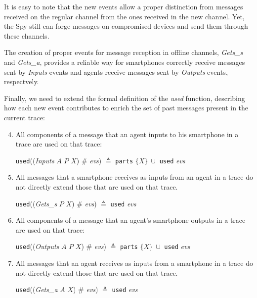 It is easy to note that the new events allow a proper distinction from messages received on the regular channel from the ones received in the new channel. Yet, the Spy still can forge messages on compromised devices and send them through these channels.

The creation of proper events for message reception in offline channels, \textit{Gets\_s} and \textit{Gets\_a}, provides a reliable way for smartphones correctly receive messages sent by \textit{Inputs} events and agents receive messages sent by \textit{Outputs} events, respectvely.

Finally, we need to extend the formal definition of the \textit{used} function, describing how each new event contributes to enrich the set of past messages present in the current trace:

\begin{enumerate}
  \setcounter{enumi}{3}
  \item All components of a message that an agent inputs to his smartphone in a trace are used on that trace:
  \begin{center}
    \texttt{used}((\textit{Inputs} $A$ $P$ $X$) $\#$ \textit{evs}) $\triangleq$ \texttt{parts} $\{ X\}\ \cup$ \texttt{used} \textit{evs}
  \end{center}

  \item All messages that a smartphone receives as inputs from an agent in a trace do not directly extend those that are used on that trace.
  \begin{center}
    \texttt{used}((\textit{Gets\_s} $P$ $X$) $\#$ \textit{evs}) $\triangleq$ \texttt{used} \textit{evs}
  \end{center}

  \item All components of a message that an agent's smartphone outputs in a trace are used on that trace:
  \begin{center}
    \texttt{used}((\textit{Outputs} $A$ $P$ $X$) $\#$ \textit{evs}) $\triangleq$ \texttt{parts} $\{ X\}\ \cup$ \texttt{used} \textit{evs}
  \end{center}

  \item All messages that an agent receives as inputs from a smartphone in a trace do not directly extend those that are used on that trace.
  \begin{center}
    \texttt{used}((\textit{Gets\_a} $A$ $X$) $\#$ \textit{evs}) $\triangleq$ \texttt{used} \textit{evs}
  \end{center}
\end{enumerate}

